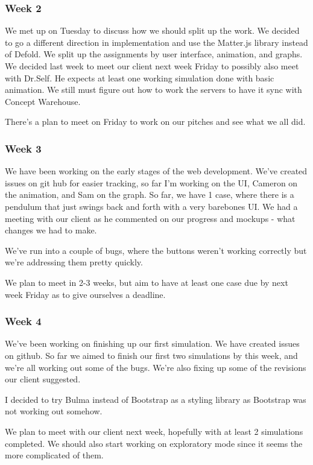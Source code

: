 \subsubsection{Week 2}
We met up on Tuesday to discuss how we should split up the work. We decided to go a different direction in implementation and use the Matter.js library instead of Defold. We split up the assignments by user interface, animation, and graphs. We decided last week to meet our client next week Friday to possibly also meet with Dr.Self. He expects at least one working simulation done with basic animation. We still must figure out how to work the servers to have it sync with Concept Warehouse. 

There's a plan to meet on Friday to work on our pitches and see what we all did. 

\subsubsection{Week 3}
We have been working on the early stages of the web development. We've created issues on git hub for easier tracking, so far I'm working on the UI, Cameron on the animation, and Sam on the graph. So far, we have 1 case, where there is a pendulum that just swings back and forth with a very barebones UI. We had a meeting with our client as he commented on our progress and mockups - what changes we had to make. 

We've run into a couple of bugs, where the buttons weren't working correctly but we're addressing them pretty quickly. 

We plan to meet in 2-3 weeks, but aim to have at least one case due by next week Friday as to give ourselves a deadline. 

\subsubsection{Week 4}
We've been working on finishing up our first simulation. We have created issues on github. So far we aimed to finish our first two simulations by this week, and we're all working out some of the bugs. We're also fixing up some of the revisions our client suggested.

I decided to try Bulma instead of Bootstrap as a styling library as Bootstrap was not working out somehow. 

We plan to meet with our client next week, hopefully with at least 2 simulations completed. We should also start working on exploratory mode since it seems the  more complicated of them.

